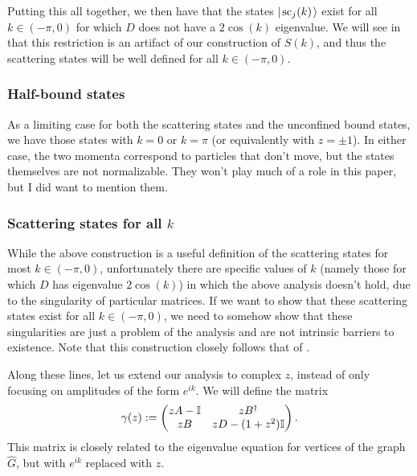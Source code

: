 \documentclass[../thesis-main/thesis-main]{subfiles}
\begin{document}
Putting this all together, we then have that the states $|\mspace{2mu} \text{sc}_j(k) \mspace{2mu} \rangle$ exist for all $k\in (-\pi,0)$ for which $D$ does not have a $2\cos(k)$ eigenvalue.  We will see in  that this restriction is an artifact of our construction of $S(k)$, and thus the scattering states will be well defined for all $k\in (-\pi,0)$.


\subsubsection{Half-bound states}

As a limiting case for both the scattering states and the unconfined bound states, we have those states with $k = 0$ or $k= \pi$ (or equivalently with $z = \pm 1$).  In either case, the two momenta correspond to particles that don't move, but the states themselves are not normalizable.  They won't play much of a role in this paper, but I did want to mention them.


\subsubsection{Scattering states for all $k$}\label{sec:def_of_gamma_matrix}

While the above construction is a useful definition of the scattering states for most ${k\in(-\pi,0)}$, unfortunately there are specific values of $k$ (namely those for which $D$ has eigenvalue $2\cos(k)$) in which the above analysis doesn't hold, due to the singularity of particular matrices.  If we want to show that these scattering states exist for all $k\in (-\pi,0)$, we need to somehow show that these singularities are just a problem of the analysis and are not intrinsic barriers to existence.  Note that this construction closely follows that of \cite{CG12}.

Along these lines, let us extend our analysis to complex $z$, instead of only focusing on amplitudes of the form $e^{ik}$.  We will define the matrix
\begin{equation}
  \gamma(z) := \begin{pmatrix}  z A - \mathbb{I} & z B^\dag\\
    z B & zD - (1+z^2) \mathbb{I}\end{pmatrix}.
    \label{eq:gamma_def}
\end{equation}
This matrix is closely related to the eigenvalue equation for vertices of the graph $\widehat{G}$, but with $e^{ik}$ replaced with $z$.  
\end{document}
